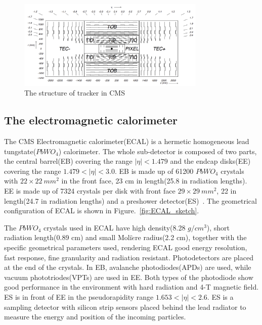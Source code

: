 \begin{figure}[htbp] 
\centering
\includegraphics[width=0.8\textwidth]{chapter3/Tracker_structure.png}
\caption{The structure of tracker in CMS~\cite{CMS_experiment}}
\label{fig:tracker_sketch}
\end{figure}



\subsection{The electromagnetic calorimeter}

The CMS Electromagnetic calorimeter(ECAL) is a hermetic homogeneous lead tungstate($PbWO_{4}$) calorimeter. The whole sub-detector is composed of two parts, the central barrel(EB) covering the range $|\eta|<1.479$ and the endcap disks(EE) covering the range $1.479<|\eta|<3.0$. EB is made up of 61200 $PbWO_{4}$ crystals with $22\times22~mm^{2}$ in the front face, 23 cm in length(25.8 in radiation lengths). EE is made up of 7324 crystals per disk with front face $29\times29~mm^{2}$, 22 in length(24.7 in radiation lengths) and a preshower detector(ES)~\cite{CMS_TDR}. The geometrical configuration of ECAL is shown in Figure.~\ref{fig:ECAL_sketch}. 

The $PbWO_{4}$ crystals used in ECAL have high density(8.28 $g/cm^{3}$), short radiation length(0.89 cm) and small Moli$\grave{e}$re radius(2.2 cm), together with the specific geometrical parameters used, rendering ECAL  good energy resolution, fast response, fine granularity and radiation resistant. Photodetectors are placed at the end of the crystals. In EB, avalanche photodiodes(APDs) are used, while vacuum phototriodes(VPTs) are used in EE. Both types of the photodiode show good performance in the environment with hard radiation and 4-T magnetic field. ES is in front of EE in the pseudorapidity range $1.653<|\eta|<2.6$. ES is a sampling detector with silicon strip sensors placed behind the lead radiator to measure the energy and position of the incoming particles.  

